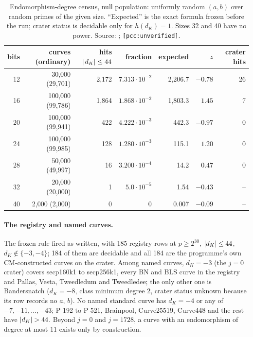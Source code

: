 \begin{table}[t]
\centering\footnotesize
\begin{tabular}{@{}rrrrrrr@{}}
\toprule
bits & curves (ordinary) & hits $\lvert d_K \rvert\le44$ & fraction & expected & $z$ & crater hits \\
\midrule
12 & 30{,}000 (29{,}701) & 2{,}172 & $7.313\cdot10^{-2}$ & 2{,}206.7 & $-0.78$ & 26 \\
16 & 100{,}000 (99{,}786) & 1{,}864 & $1.868\cdot10^{-2}$ & 1{,}803.3 & $1.45$ & 7 \\
20 & 100{,}000 (99{,}941) & 422 & $4.222\cdot10^{-3}$ & 442.3 & $-0.97$ & 0 \\
24 & 100{,}000 (99{,}985) & 128 & $1.280\cdot10^{-3}$ & 115.1 & $1.20$ & 0 \\
28 & 50{,}000 (49{,}997) & 16 & $3.200\cdot10^{-4}$ & 14.2 & $0.47$ & 0 \\
32 & 20{,}000 (20{,}000) & 1 & $5.0\cdot10^{-5}$ & 1.54 & $-0.43$ & -- \\
40 & 2{,}000 (2{,}000) & 0 & 0 & 0.007 & $-0.09$ & -- \\
\bottomrule
\end{tabular}
\caption[]{Endomorphism-degree census, null population: uniformly random
$(a,b)$ over random primes of the given size. ``Expected'' is the exact
formula frozen before the run; crater status is decidable only for
$h(d_K)=1$. Sizes 32 and 40 have no power. Source:
;
\texttt{[pcc:unverified]}.}
\label{tab:iso-endo}
\end{table}

\paragraph{The registry and named curves.} The frozen rule fired as written,
with 185 registry rows at $p\ge2^{30}$, $\lvert d_K \rvert\le44$, $d_K\notin\{-3,-4\}$;
184 of them are decidable and all 184 are the programme's own
CM-constructed curves on the crater. Among named curves, $d_K=-3$ (the
$j=0$ crater) covers secp160k1 to secp256k1, every BN and BLS curve in the
registry and Pallas, Vesta, Tweedledum and Tweedledee; the only other one is
Bandersnatch ($d_K=-8$, class minimum degree 2, crater status unknown
because its row records no $a$, $b$). No named standard curve has $d_K=-4$
or any of $-7,-11,\dots,-43$; P-192 to P-521, Brainpool, Curve25519,
Curve448 and the rest have $\lvert d_K \rvert>44$. Beyond $j=0$ and $j=1728$, a
curve with an endomorphism of degree at most 11 exists only by
construction.

